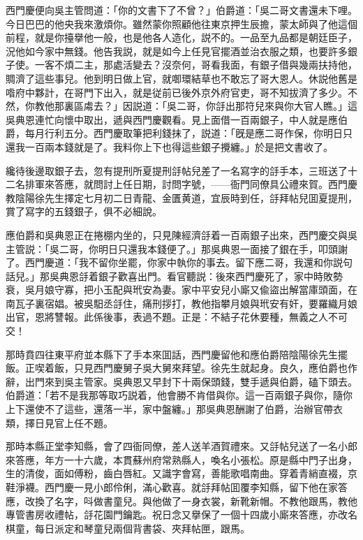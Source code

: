 西門慶便向吳主管問道：「你的文書下了不曾？」伯爵道：「吳二哥文書還未下哩。今日巴巴的他央我來激煩你。雖然蒙你照顧他往東京押生辰擔，蒙太師與了他這個前程，就是你擡擧他一般，也是他各人造化，説不的。一品至九品都是朝廷臣子，況他如今家中無錢。他告我説，就是如今上任見官擺酒並治衣服之類，也要許多銀子使。一客不煩二主，那處活變去？沒奈何，哥看我面，有銀子借與幾兩扶持他，賙濟了這些事兒。他到明日做上官，就啣環結草也不敢忘了哥大恩人。休説他舊是喒府中夥計，在哥門下出入，就是従前已後外京外府官吏，哥不知拔濟了多少。不然，你教他那裏區䖏去？」因説道：「吳二哥，你㧱出那符兒來與你大官人瞧。」這吳典恩連忙向懷中取出，遞與西門慶觀看。見上面借一百兩銀子，中人就是應伯爵，每月行利五分。西門慶取筆把利錢抹了，説道：「旣是應二哥作保，你明日只還我一百兩本錢就是了。我料你上下也得這些銀子攪纏。」於是把文書收了。

纔待後邊取銀子去，忽有提刑所夏提刑㧱帖兒差了一名寫字的㧱手本，三班送了十二名排軍來答應，就問討上任日期，討問字號，——衙門同僚具公禮來賀。西門慶教陰陽徐先生擇定七月初二日青龍、金匱黄道，宜辰時到任，㧱拜帖兒囬夏提刑，賞了寫字的五錢銀子，俱不必細說。

應伯爵和吳典恩正在捲棚内坐的，只見陳經濟㧱着一百兩銀子出來，西門慶交與吳主管説：「吳二哥，你明日只還我本錢便了。」那吳典恩一面接了銀在手，叩頭謝了。西門慶道：「我不留你坐罷，你家中執你的事去。留下應二哥，我還和你説句話兒。」那吳典恩㧱着銀子歡喜出門。看官聽説：後來西門慶死了，家中時敗勢衰，吳月娘守寡，把小玉配與玳安為妻。家中平安兒小廝又偸盜出解當庫頭面，在南瓦子裏宿娼。被吳馹丞㧱住，痛刑拶打，教他指攀月娘與玳安有奸，要羅織月娘出官，恩將讐報。此係後事，表過不題。正是：不結子花休要種，無義之人不可交！

那時賁四往東平府並本縣下了手本來囬話，西門慶留他和應伯爵陪陰陽徐先生擺飯。正喫着飯，只見西門慶舅子吳大舅來拜望。徐先生就起身。良久，應伯爵也作辭，出門來到吳主管家。吳典恩又早封下十兩保頭錢，雙手遞與伯爵，磕下頭去。伯爵道：「若不是我那等取巧説着，他會勝不肯借與你。這一百兩銀子與你，隨你上下還使不了這些，還落一半，家中盤纏。」那吳典恩酬謝了伯爵，治辦官帶衣類，擇日見官上任不題。

那時本縣正堂李知縣，會了四衙同僚，差人送羊酒賀禮來。又㧱帖兒送了一名小郎來答應，年方一十六歲，本貫蘇州府常熟縣人，喚名小張松。原是縣中門子出身，生的清俊，面如傅粉，齒白唇紅。又識字會寫，善能歌唱南曲。穿着青綃直裰，京鞋淨襪。西門慶一見小郎伶俐，滿心歡喜。就㧱拜帖囬覆李知縣，留下他在家答應，改換了名字，呌做書童兒。與他做了一身衣裳，新靴新帽。不教他跟馬，教他專管書房收禮帖，㧱花園門鑰匙。祝日念又擧保了一個十四歲小廝來答應，亦改名棋童，每日派定和琴童兒兩個背書袋、夾拜帖匣，跟馬。

